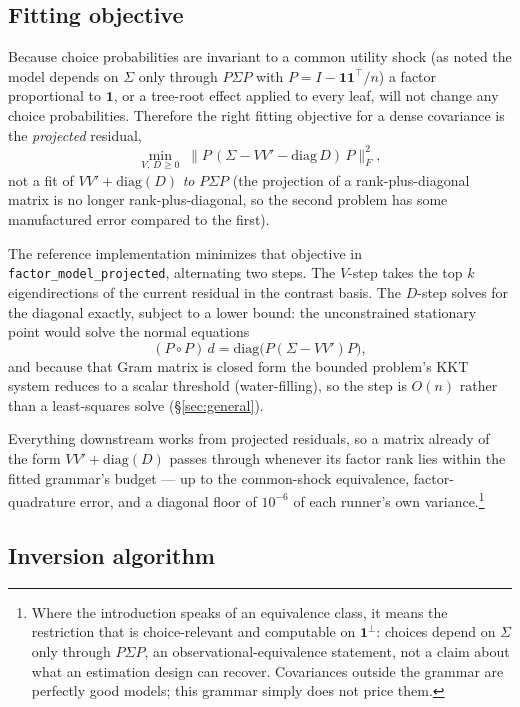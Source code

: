 \documentclass[11pt]{article}
\begin{document}
\subsection{Fitting objective}

Because choice probabilities are
invariant to a common utility shock (as noted the model depends on $\Sigma$ only
through $P\Sigma P$ with $P=I-\mathbf{1}\mathbf{1}^{\top}/n$) a factor
proportional to $\mathbf{1}$, or a tree-root effect applied to every leaf, will not change any choice probabilities. Therefore the right fitting objective for a dense covariance
is the {\em projected} residual,
\[
\min_{V,\,D\ge0}\;\bigl\lVert P\,(\Sigma-VV'-\mathrm{diag}\,D)\,P\bigr\rVert_F^2,
\]
not a fit of $VV'+\mathrm{diag}(D)$ \emph{to} $P\Sigma P$ (the projection
of a rank-plus-diagonal matrix is no longer rank-plus-diagonal, so the
second problem has some manufactured error compared to the first).

The reference implementation minimizes that objective in
\texttt{factor\_model\_projected}, alternating two steps. The $V$-step
takes the top $k$ eigendirections of the current residual in the contrast
basis. The $D$-step solves for the diagonal exactly, subject to a lower
bound: the unconstrained stationary point would solve the normal equations
\[
  (P\!\circ\!P)\,d=\mathrm{diag}\bigl(P(\Sigma-VV')P\bigr),
\]
and because that Gram matrix is closed form the bounded problem's KKT
system reduces to a scalar threshold (water-filling), so the step is
$O(n)$ rather than a least-squares solve (\S\ref{sec:general}).

Everything downstream works from projected residuals, so a matrix
already of the form $VV'+\mathrm{diag}(D)$ passes through whenever its
factor rank lies within the fitted grammar's budget --- up to the
common-shock equivalence, factor-quadrature error, and a diagonal floor
of $10^{-6}$ of each runner's own variance.\footnote{Where
the introduction speaks of an equivalence class, it means the restriction
that is choice-relevant and computable on $\mathbf{1}^{\perp}$: choices
depend on $\Sigma$ only through $P\Sigma P$, an observational-equivalence
statement, not a claim about what an estimation design can recover.
Covariances outside the grammar are perfectly good models; this grammar
simply does not price them.}

\subsection{Inversion algorithm}
\end{document}
